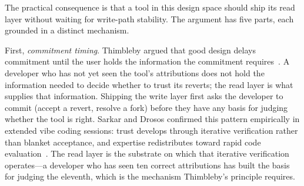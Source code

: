 The practical consequence is that a tool in this design space should ship its
read layer without waiting for write-path stability. The argument has five
parts, each grounded in a distinct mechanism.

First, \emph{commitment timing}. Thimbleby argued that good design delays
commitment until the user holds the information the commitment
requires~\cite{thimbleby1988}. A developer who has not yet seen the tool's
attributions does not hold the information needed to decide whether to trust
its reverts; the read layer is what supplies that information. Shipping the
write layer first asks the developer to commit (accept a revert, resolve a
fork) before they have any basis for judging whether the tool is right.
Sarkar and Drosos confirmed this pattern empirically in extended vibe coding
sessions: trust develops through iterative verification rather than blanket
acceptance, and expertise redistributes toward rapid code
evaluation~\cite{sarkar2025}. The read layer is the substrate on which that
iterative verification operates---a developer who has seen ten correct
attributions has built the basis for judging the eleventh, which is the
mechanism Thimbleby's principle requires.

